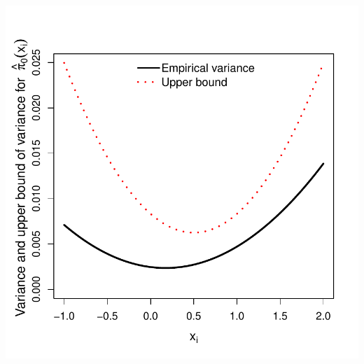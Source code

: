 \documentclass{article}\usepackage[]{graphicx}\usepackage[]{color}
\makeatletter
\def\maxwidth{ %
  \ifdim\Gin@nat@width>\linewidth
    \linewidth
  \else
    \Gin@nat@width
  \fi
}
\newenvironment{knitrout}{}{} %
\makeatother
\begin{document}
\begin{knitrout}
{\centering \includegraphics[width=\maxwidth]{figures/Fig2b-1} 

}



\end{knitrout}
\end{document}
